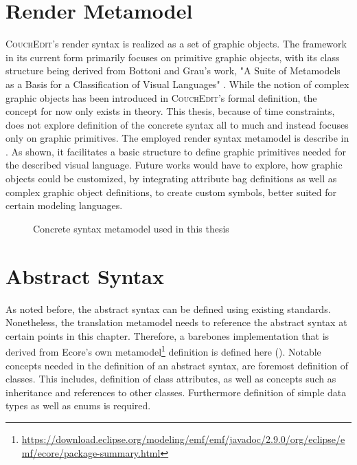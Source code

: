 \section{Render Metamodel}
\textsc{CouchEdit}'s render syntax is realized as a set of graphic objects. The framework in its current form primarily focuses on primitive graphic objects, with its class structure being derived \cite[p.39]{nachreiner_couchedit_2020} from Bottoni and Grau's work, "A Suite of Metamodels as a Basis for a Classification of Visual Languages" \cite{bottoni_suite_2004}. While the notion of complex graphic objects has been introduced in \textsc{CouchEdit}'s formal definition, the concept for now only exists in theory. This thesis, because of time constraints, does not explore definition of the concrete syntax all to much and instead focuses only on graphic primitives. The employed render syntax metamodel is describe in . As shown, it facilitates a basic structure to define graphic primitives needed for the described visual language. Future works would have to explore, how graphic objects could be customized, by integrating attribute bag definitions as well as complex graphic object definitions, to create custom symbols, better suited for certain modeling languages.

\begin{figure}
  \centering
  
  \caption{Concrete syntax metamodel used in this thesis}
  \label{fig:concretesyntax}
\end{figure}


\section{Abstract Syntax}
\label{sec:abstract-syntax}
As noted before, the abstract syntax can be defined using existing standards. Nonetheless, the translation metamodel needs to reference the abstract syntax at certain points in this chapter. Therefore, a barebones implementation that is derived from Ecore's own metamodel\footnote{\url{https://download.eclipse.org/modeling/emf/emf/javadoc/2.9.0/org/eclipse/emf/ecore/package-summary.html}} definition is defined here (). Notable concepts needed in the definition of an abstract syntax, are foremost definition of classes. This includes, definition of class attributes, as well as concepts such as inheritance and references to other classes. Furthermore definition of simple data types as well as enums is required. 

